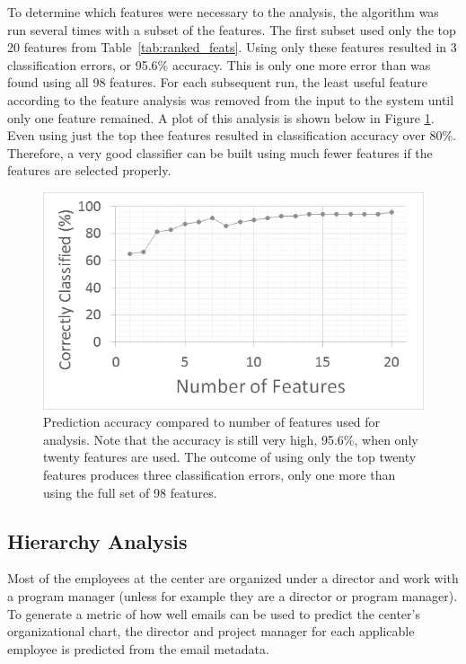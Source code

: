 \documentclass[10pt,twocolumn,conference]{IEEEtran}
\begin{document}
To determine which features were necessary to the analysis, the algorithm was run several times with a subset of the features.  The first subset used only the top 20 features from Table~\ref{tab:ranked_feats}.  Using only these features resulted in 3 classification errors, or 95.6\% accuracy.  This is only one more error than was found using all 98 features.  For each subsequent run, the least useful feature according to the feature analysis was removed from the input to the system until only one feature remained.  A plot of this analysis is shown below in Figure \ref{fig:feat_analysis}.  Even using just the top thee features resulted in classification accuracy over 80\%.  Therefore, a very good classifier can be built using much fewer features if the features are selected properly.
\begin{figure}[t]
    \centering
        \includegraphics[width=.9\columnwidth,trim={1mm 6mm 1mm 3.5mm},clip]{FeatureAnalysis}
        \vspace{-7pt}
        \caption{Prediction accuracy compared to number of features used for analysis.  Note that the accuracy is still very high, 95.6\%, when only twenty features are used.  The outcome of using only the top twenty features produces three classification errors, only one more than using the full set of 98 features. }
        \label{fig:feat_analysis}
\end{figure}

\subsection{Hierarchy Analysis}
Most of the employees at the center are organized under a director and work with a program manager (unless for example they are a director or program manager).  To generate a metric of how well emails can be used to predict the center's organizational chart, the director and project manager for each applicable employee is predicted from the email metadata. 
\end{document}
